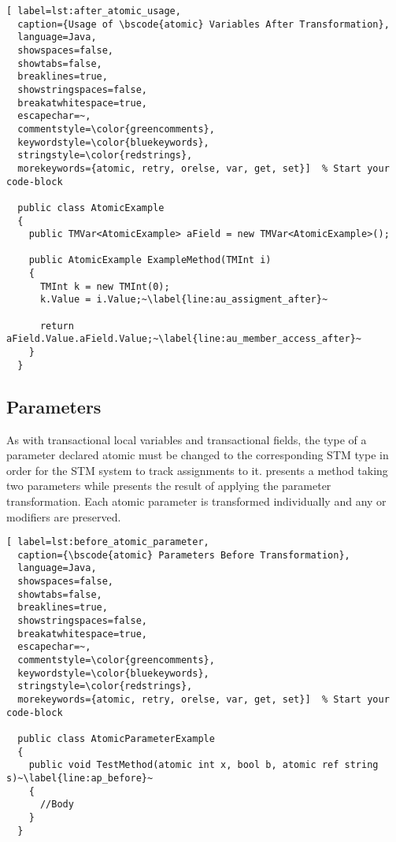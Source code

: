 \begin{lstlisting}[ label=lst:after_atomic_usage,
  caption={Usage of \bscode{atomic} Variables After Transformation},
  language=Java,  
  showspaces=false,
  showtabs=false,
  breaklines=true,
  showstringspaces=false,
  breakatwhitespace=true,
  escapechar=~,
  commentstyle=\color{greencomments},
  keywordstyle=\color{bluekeywords},
  stringstyle=\color{redstrings},
  morekeywords={atomic, retry, orelse, var, get, set}]  % Start your code-block

  public class AtomicExample
  {
    public TMVar<AtomicExample> aField = new TMVar<AtomicExample>();

    public AtomicExample ExampleMethod(TMInt i)
    {
      TMInt k = new TMInt(0);
      k.Value = i.Value;~\label{line:au_assigment_after}~

      return aField.Value.aField.Value;~\label{line:au_member_access_after}~
    }
  }
\end{lstlisting}


\subsection{Parameters}
\label{subsec:roslyn_extension_parameters}
As with transactional local variables and transactional fields, the type of a parameter declared atomic must be changed to the corresponding \ac{STM} type in order for the \ac{STM} system to track assignments to it.  presents a method taking two  parameters while  presents the result of applying the parameter transformation. Each atomic parameter is transformed individually and any  or  modifiers are preserved.


\begin{lstlisting}[ label=lst:before_atomic_parameter,
  caption={\bscode{atomic} Parameters Before Transformation},
  language=Java,  
  showspaces=false,
  showtabs=false,
  breaklines=true,
  showstringspaces=false,
  breakatwhitespace=true,
  escapechar=~,
  commentstyle=\color{greencomments},
  keywordstyle=\color{bluekeywords},
  stringstyle=\color{redstrings},
  morekeywords={atomic, retry, orelse, var, get, set}]  % Start your code-block

  public class AtomicParameterExample
  {
    public void TestMethod(atomic int x, bool b, atomic ref string s)~\label{line:ap_before}~
    {
      //Body
    }
  }
\end{lstlisting}

